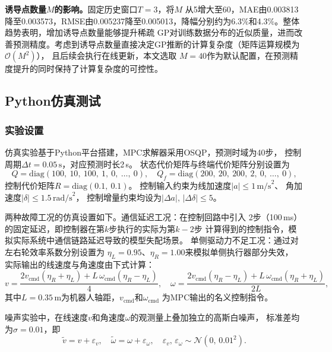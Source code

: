 \textbf{诱导点数量$M$的影响。}固定历史窗口$T=3$，将$M$
从5增大至60，MAE由0.003813降至0.003573，RMSE由0.005237降至0.005013，降幅分别约为6.3\%和4.3\%。整体趋势表明，增加诱导点数量能够提升稀疏
GP对训练数据分布的近似质量，进而改善预测精度。考虑到诱导点数量直接决定GP推断的计算复杂度（矩阵运算规模为$\mathcal{O}(M^2)$），
且后续会执行在线更新，本文选取
$M=40$作为默认配置，在预测精度提升的同时保持了计算复杂度的可控性。

\subsection{Python仿真测试}

\subsubsection{实验设置}

仿真实验基于Python平台搭建，MPC求解器采用OSQP，预测时域为40步，
控制周期$\Delta t = 0.05\,\text{s}$，对应预测时长2\,s。
状态代价矩阵与终端代价矩阵分别设置为
\begin{equation}
    Q = \mathrm{diag}(100,\ 10,\ 100,\ 1,\ 0,\ \ldots,\ 0),\quad
    Q_f = \mathrm{diag}(200,\ 20,\ 200,\ 2,\ 0,\ \ldots,\ 0),
\end{equation}
控制代价矩阵$R = \mathrm{diag}(0.1,\ 0.1)$。
控制输入约束为线加速度$|a| \leq 1\,\text{m/s}^2$、
角加速度$|\delta| \leq 1.5\,\text{rad/s}^2$，
控制增量约束均设为$|\Delta a|,\, |\Delta \delta| \leq 5$。

两种故障工况的仿真设置如下。通信延迟工况：在控制回路中引入
2步（100\,ms）的固定延迟，即控制器在第$k$步执行的实际为第$k-2$步
计算得到的控制指令，模拟实际系统中通信链路延迟导致的模型失配场景。
单侧驱动力不足工况：通过对左右轮效率系数分别设置为
$\eta_L = 0.95$、$\eta_R = 1.00$来模拟单侧执行器部分失效，
实际输出的线速度与角速度由下式计算：
\begin{equation}
    v = \frac{2v_{\text{cmd}}(\eta_R + \eta_L) 
    + L\,\omega_{\text{cmd}}(\eta_R - \eta_L)}{4}, \quad
    \omega = \frac{2v_{\text{cmd}}(\eta_R - \eta_L) 
    + L\,\omega_{\text{cmd}}(\eta_R + \eta_L)}{2L},
\end{equation}
其中$L = 0.35\,\text{m}$为机器人轴距，$v_{\text{cmd}}$和$\omega_{\text{cmd}}$
为MPC输出的名义控制指令。

噪声实验中，在线速度$v$和角速度$\omega$的观测量上叠加独立的高斯白噪声，
标准差均为$\sigma = 0.01$，即
\begin{equation}
    \tilde{v} = v + \varepsilon_v, \quad
    \tilde{\omega} = \omega + \varepsilon_\omega, \quad
    \varepsilon_v,\, \varepsilon_\omega \sim \mathcal{N}(0,\, 0.01^2).
\end{equation}

